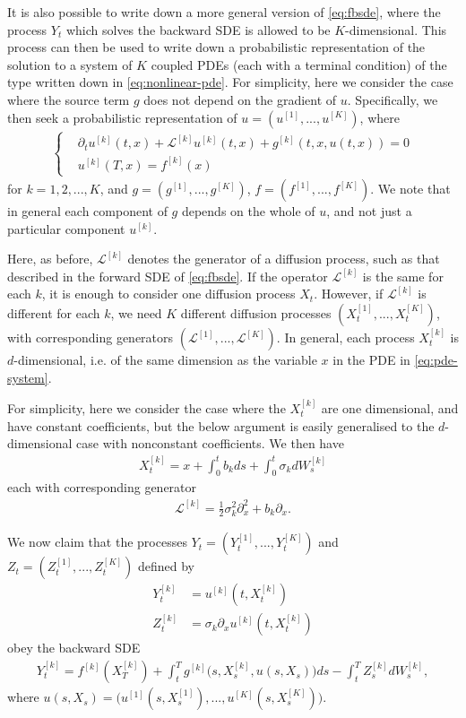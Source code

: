 \documentclass{article}  %
\begin{document}
It is also possible to write down a more general version of \autoref{eq:fbsde}, where the process $Y_t$ which solves the backward SDE is allowed to be $K$-dimensional. This process can then be used to write down a probabilistic representation of the solution to a system of $K$ coupled PDEs (each with a terminal condition) of the type written down in \autoref{eq:nonlinear-pde}. For simplicity, here we consider the case where the source term $g$ does not depend on the gradient of $u$. Specifically, we then seek a probabilistic representation of $u = (u^{[1]},...,u^{[K]})$, where 
%
\begin{align} 
    \label{eq:pde-system}
\begin{cases}
    &\partial_t u^{[k]}(t,x) + \mathcal{L}^{[k]} u^{[k]}(t,x) + g^{[k]}(t,x,u(t,x)) = 0\\
    &u^{[k]}(T,x) = f^{[k]}(x)
\end{cases}
\end{align}
%
for $k=1,2,...,K$, and $g=(g^{[1]},...,g^{[K]})$, $f=(f^{[1]},...,f^{[K]})$. We note that in general each component of $g$ depends on the whole of $u$, and not just a particular component $u^{[k]}$.

Here, as before, $\mathcal{L}^{[k]}$ denotes the generator of a diffusion process, such as that described in the forward SDE of \autoref{eq:fbsde}. If the operator $\mathcal{L}^{[k]}$ is the same for each $k$, it is enough to consider one diffusion process $X_t$. However, if $\mathcal{L}^{[k]}$ is different for each $k$, we need $K$ different diffusion processes $(X_t^{[1]},...,X_t^{[K]})$, with corresponding generators $(\mathcal{L}^{[1]},...,\mathcal{L}^{[K]})$. In general, each process $X_t^{[k]}$ is $d$-dimensional, i.e. of the same dimension as the variable $x$ in the PDE in \autoref{eq:pde-system}. 

For simplicity, here we consider the case where the $X_t^{[k]}$ are one dimensional, and have constant coefficients, but the below argument is easily generalised to the $d$-dimensional case with nonconstant coefficients. We then have
%
\begin{align} 
    X_t^{[k]} = x + \int_{0}^{t} b_k ds + \int_{0}^{t}\sigma_k dW_s^{[k]}
\end{align}
%
each with corresponding generator
%
\begin{align} 
    \mathcal{L}^{[k]} = \frac{1}{2} \sigma_k^2 \partial_x^2 + b_k \partial_x.
\end{align}
%

We now claim that the processes $Y_t = (Y_t^{[1]},...,Y_t^{[K]})$ and $Z_t=(Z_t^{[1]},...,Z_t^{[K]})$ defined by 
%
\begin{align}
    \label{eq:y-def}
    Y_t^{[k]} &= u^{[k]}(t,X_t^{[k]})\\
    Z_t^{[k]} &= \sigma_k \partial_x u^{[k]}(t,X_t^{[k]})
\end{align}
%
obey the backward SDE
%
\begin{align} 
    \label{eq:component-bsde}
    Y_t^{[k]} = f^{[k]}(X_T^{[k]}) + \int_t^T g^{[k]}\big( s, X_s^{[k]},u(s,X_s) \big)ds - \int_t^T Z_s^{[k]}dW_s^{[k]},
\end{align}
%
where $u(s,X_s) = \big( u^{[1]}(s,X_s^{[1]}),..., u^{[K]}(s,X_s^{[K]})\big)$.
\end{document}
